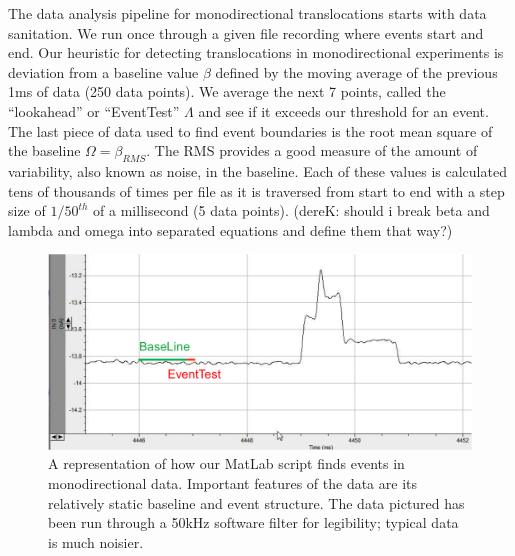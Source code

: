 \documentclass[aps,prl,preprint,groupedaddress]{revtex4}
\begin{document}
The data analysis pipeline for monodirectional translocations starts with data sanitation.
We run once through a given file recording where events start and end.
Our heuristic for detecting translocations in monodirectional experiments is deviation from a baseline value \(\beta\) defined by the moving average of the previous 1ms of data (250 data points).
We average the next 7 points, called the ``lookahead'' or ``EventTest'' \(\Lambda\) and see if it exceeds our threshold for an event.
The last piece of data used to find event boundaries is the root mean square of the baseline \(\Omega = \beta_{RMS}\).
The RMS provides a good measure of the amount of variability, also known as noise, in the baseline.
Each of these values is calculated tens of thousands of times per file as it is traversed from start to end with a step size of \(1/50^{th}\) of a millisecond (5 data points). (dereK: should i break beta and lambda and omega into separated equations and define them that way?)
\begin{figure}[h]
\centering
\includegraphics[width=.8\textwidth]{figures/find-events}
\caption{A representation of how our MatLab script finds events in monodirectional data. Important features of the data are its relatively static baseline and event structure. The data pictured has been run through a 50kHz software filter for legibility; typical data is much noisier.}
\label{fig:find-events}
\end{figure}
\end{document}
